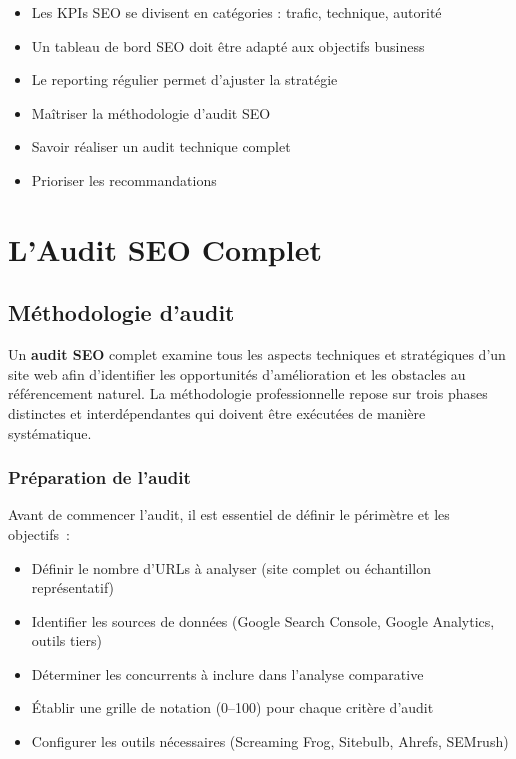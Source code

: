 \documentclass[12pt,a4paper,twoside]{report}
\newcommand{\keyword}[1]{\textbf{\textcolor{googleblue}{#1}}}
\newcommand{\level}[1]{\medskip\bigskip}
\begin{document}
\begin{takeaways}
\begin{itemize}
    \item Les KPIs SEO se divisent en catégories : trafic, technique, autorité
    \item Un tableau de bord SEO doit être adapté aux objectifs business
    \item Le reporting régulier permet d'ajuster la stratégie
\end{itemize}
\end{takeaways}

\level{2}
\begin{objectives}
\begin{itemize}
    \item Maîtriser la méthodologie d'audit SEO
    \item Savoir réaliser un audit technique complet
    \item Prioriser les recommandations
\end{itemize}
\end{objectives}

\chapter{L'Audit SEO Complet}
\label{ch:audit}

\section{Méthodologie d'audit}

Un \keyword{audit SEO} complet examine tous les aspects techniques et stratégiques d'un site web afin d'identifier les opportunités d'amélioration et les obstacles au référencement naturel. La méthodologie professionnelle repose sur trois phases distinctes et interdépendantes qui doivent être exécutées de manière systématique.

\subsection{Préparation de l'audit}

Avant de commencer l'audit, il est essentiel de définir le périmètre et les objectifs~:
\begin{itemize}
    \item Définir le nombre d'URLs à analyser (site complet ou échantillon représentatif)
    \item Identifier les sources de données (Google Search Console, Google Analytics, outils tiers)
    \item Déterminer les concurrents à inclure dans l'analyse comparative
    \item Établir une grille de notation (0--100) pour chaque critère d'audit
    \item Configurer les outils nécessaires (Screaming Frog, Sitebulb, Ahrefs, SEMrush)
\end{itemize}
\end{document}
